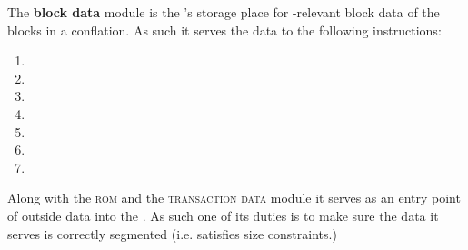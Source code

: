 The \textbf{block data} module \btcMod{} is the \zkEvm{}'s storage place for \evm{}-relevant block data of the blocks in a conflation.
As such it serves the \hubMod{} data to the following instructions:
\begin{multicols}{4}
	\begin{enumerate}
		\item {}
		\item {}
		\item {}
		\item {}
		\item {}
		\item {}
		\item {}
	\end{enumerate}
\end{multicols}
Along with the \textsc{rom} and the \textsc{transaction data} module it serves as an entry point of outside data into the \zkEvm{}.
As such one of its duties is to make sure the data it serves is correctly segmented (i.e. satisfies size constraints.)
